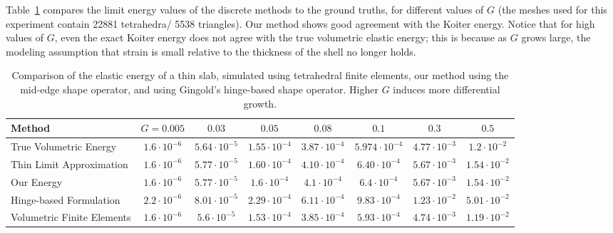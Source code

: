 \documentclass[timestamp,acmtog]{acmart}
\begin{document}
Table~\ref{tab:energy} compares the limit energy values of the discrete methods to the ground truths, for different values of $G$ (the meshes used for this experiment contain 22881 tetrahedra/ 5538 triangles).  Our method shows good agreement with the Koiter energy. Notice that for high values of $G$, even the exact Koiter energy does not agree with the true volumetric elastic energy; this is because as $G$ grows large, the modeling assumption that strain is small relative to the thickness of the shell no longer holds. 
\begin{table}
\begin{tabular}{l|ccccccc}
Method & $G=0.005$ & $0.03$ & $0.05$ & $0.08$ & $0.1$ & $0.3$ & $0.5$  \\
\hline
True Volumetric Energy & $1.6\cdot 10^{-6}$ & $5.64 \cdot 10^{-5}$ & $1.55 \cdot 10^{-4}$ & $3.87 \cdot 10^{-4}$ & $5.974 \cdot 10^{-4}$ & $4.77 \cdot 10^{-3}$ & $1.2 \cdot 10^{-2}$ \\
Thin Limit Approximation & $1.6\cdot 10^{-6}$ & $5.77\cdot 10^{-5}$  &  $1.60\cdot10^{-4}$ & $4.10\cdot 10^{-4}$ & $6.40 \cdot 10^{-4}$ & $5.67 \cdot 10^{-3}$ & $1.54\cdot 10^{-2}$\\
\hline
Our Energy & $1.6 \cdot 10^{-6}$ & $5.77 \cdot 10^{-5}$ & $1.6 \cdot 10^{-4}$ & $4.1 \cdot 10^{-4}$ & $6.4 \cdot 10^{-4}$ & $5.67 \cdot 10^{-3}$ & $1.54 \cdot 10^{-2}$ \\
Hinge-based Formulation & $2.2 \cdot 10^{-6}$ & $8.01 \cdot 10^{-5}$ & $2.29 \cdot 10^{-4}$ & $6.11 \cdot 10^{-4}$ & $9.83 \cdot 10^{-4}$ & $1.23 \cdot 10^{-2}$ & $5.01 \cdot 10^{-2}$ \\
Volumetric Finite Elements & $1.6 \cdot 10^{-6}$ & $5.6 \cdot 10^{-5}$ & $1.53 \cdot 10^{-4}$ & $3.85 \cdot 10^{-4}$ & $5.93 \cdot 10^{-4}$ & $4.74 \cdot 10^{-3}$ & $1.19 \cdot 10^{-2}$
\end{tabular}
\caption{Comparison of the elastic energy of a thin slab, simulated using tetrahedral finite elements, our method using the mid-edge shape operator, and using Gingold's hinge-based shape operator. Higher $G$ induces more differential growth.}
\label{tab:energy}
\end{table}
\end{document}
